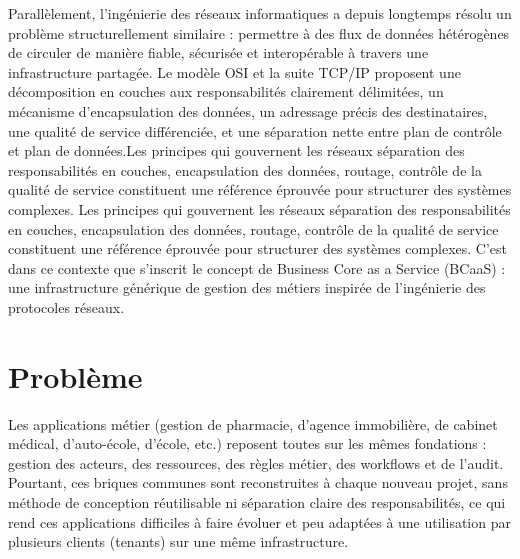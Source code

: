 Parallèlement, l'ingénierie des réseaux informatiques a depuis longtemps résolu un problème structurellement similaire : permettre à des flux de données hétérogènes de circuler de manière fiable, sécurisée et interopérable à travers une infrastructure partagée. Le modèle OSI et la suite TCP/IP proposent une décomposition en couches aux responsabilités clairement délimitées, un
mécanisme d'encapsulation des données, un adressage précis des destinataires, une qualité
de service différenciée, et une séparation nette entre plan de contrôle et plan de données.Les principes qui gouvernent les réseaux séparation des responsabilités en couches, encapsulation des données, routage, contrôle de la qualité de service constituent une référence éprouvée pour structurer des systèmes complexes. Les principes qui gouvernent les réseaux séparation des responsabilités en couches, encapsulation des données, routage, contrôle de la qualité de service constituent une référence éprouvée pour structurer des systèmes complexes. C'est dans ce contexte que s'inscrit le concept de Business Core as a Service (BCaaS) : une infrastructure générique de gestion des métiers inspirée de l'ingénierie des protocoles réseaux.

\section{Problème}


Les applications métier (gestion de pharmacie, d'agence immobilière, de cabinet médical, d'auto-école, d'école, etc.) reposent toutes sur les mêmes fondations : gestion des acteurs, des ressources, des règles métier, des workflows et de l'audit. Pourtant, ces briques communes sont reconstruites à chaque nouveau projet, sans méthode de conception réutilisable ni séparation claire des responsabilités, ce qui rend ces applications difficiles à faire évoluer et peu adaptées à une utilisation par plusieurs clients (tenants) sur une même infrastructure.\\

